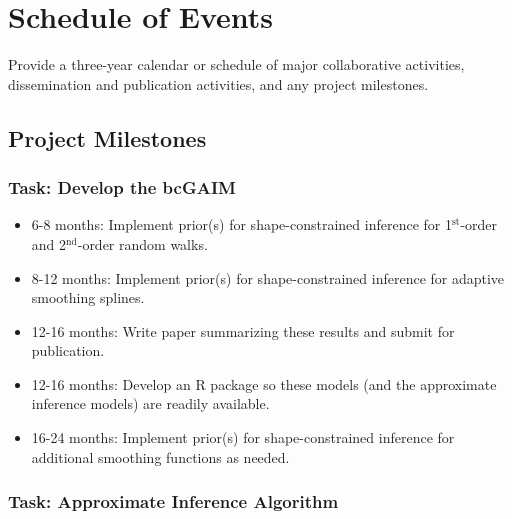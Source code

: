 \documentclass[12pt,letterpaper]{article}
\author{}
\date{\vspace{-2.5em}}
\begin{document}
\hypertarget{schedule-of-events}{%
\section{Schedule of Events}\label{schedule-of-events}}

Provide a three-year calendar or schedule of major collaborative
activities, dissemination and publication activities, and any project
milestones.

\vspace{10pt}

\hypertarget{project-milestones}{%
\subsection{Project Milestones}\label{project-milestones}}

\hypertarget{task-develop-the-bcgaim}{%
\subsubsection{Task: Develop the bcGAIM}\label{task-develop-the-bcgaim}}

\begin{itemize}
    \item 6-8 months: Implement prior(s) for shape-constrained inference for 1$^{\text{st}}$-order and 2$^{\text{nd}}$-order random walks. 
    \item 8-12 months: Implement prior(s) for shape-constrained inference for adaptive smoothing splines. 
    \item 12-16 months: Write paper summarizing these results and submit for publication. 
    \item 12-16 months: Develop an R package so these models (and the approximate inference models) are readily available.
    \item 16-24 months: Implement prior(s) for shape-constrained inference for additional smoothing functions as needed. 
\end{itemize}

\hypertarget{task-approximate-inference-algorithm}{%
\subsubsection{Task: Approximate Inference
Algorithm}\label{task-approximate-inference-algorithm}}
\end{document}
